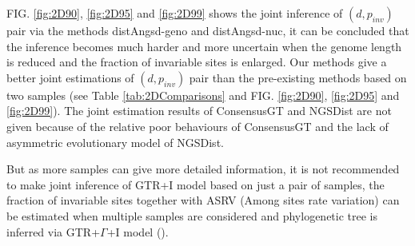 \documentclass{article}
\begin{document}
FIG. \ref{fig:2D90}, \ref{fig:2D95} and \ref{fig:2D99} shows the joint inference of $(d,p_{inv})$ pair via the methods distAngsd-geno and distAngsd-nuc, it can be concluded that the inference becomes much harder and more uncertain when the genome length is reduced and the fraction of invariable sites is enlarged. Our methods give a better joint estimations of $(d,p_{inv})$ pair than the pre-existing methods based on two samples (see Table \ref{tab:2DComparisons} and FIG. \ref{fig:2D90}, \ref{fig:2D95} and \ref{fig:2D99}). The joint estimation results of ConsensusGT and NGSDist are not given because of the relative poor behaviours of ConsensusGT and the lack of asymmetric evolutionary model of NGSDist.

But as more samples can give more detailed information, it is not recommended to make joint inference of GTR+I model based on just a pair of samples, the fraction of invariable sites together with ASRV (Among sites rate variation) can be estimated when multiple samples are considered and phylogenetic tree is inferred via GTR+$\Gamma$+I model (\cite{Yang:2006}).
\end{document}
